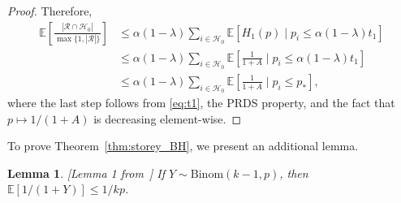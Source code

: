 \documentclass[11pt]{article}
\newtheorem{lemma}{Lemma}
\def\E{\mathbb{E}}
\begin{document}
\begin{proof}
  Therefore,
    \begin{align*}
      \E\left[\frac{|\mathcal{R} \cap \mathcal{H}_0|}{\max\{1, |\mathcal{R}|\} } \right] & \le \alpha(1 - \lambda)\sum_{i\in \mathcal{H}_0}\E\left[ H_1(p)\mid p_i \le \alpha(1 - \lambda)t_1\right]\\
           & \le \alpha(1 - \lambda)\sum_{i\in \mathcal{H}_0}\E\left[ \frac{1}{1 + A}\mid p_i \le \alpha(1 - \lambda)t_1\right]\\
      &\le \alpha(1 - \lambda)\sum_{i\in \mathcal{H}_0}\E\left[ \frac{1}{1 + A}\mid p_i \le p_{*}\right],
    \end{align*}
    where the last step follows from \eqref{eq:t1}, the PRDS property, and the fact that $p\mapsto 1 / (1 + A)$ is decreasing element-wise.
\end{proof}

To prove Theorem~\ref{thm:storey_BH}, we present an additional lemma. 
\begin{lemma}\label{lem:inverse_binomial}[Lemma 1 from~\cite{benjamini2006adaptive}]
  If $Y\sim \mathrm{Binom}(k - 1, p)$, then $\E[1 / (1 + Y)]\le 1 / kp$.
\end{lemma}
\end{document}
